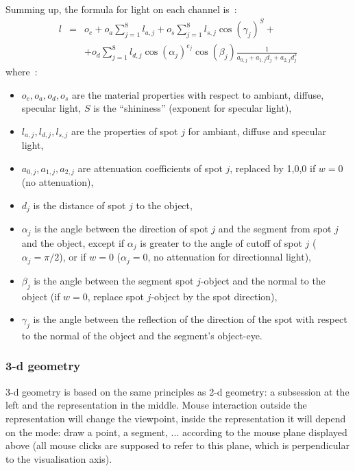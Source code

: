 \documentclass{article}
\begin{document}
Summing up, the formula for light on each channel is~:
\begin{eqnarray*}
 l &=&o_e+ o_a \sum_{j=1}^8 l_{a,j} + o_s \sum_{j=1}^8 l_{s,j}
 \cos(\gamma_j)^S + \\
 &  & +  o_d \sum_{j=1}^8 l_{d,j} 
\cos(\alpha_j)^{e_j} \cos(\beta_j) \frac{1}{a_{0,j}+a_{1,j}
  d_j+a_{2,j} d_j^2} 
\end{eqnarray*}
where~:
\begin{itemize}
\item $o_e,o_a,o_d,o_s$ are the material properties with respect to
 ambiant, diffuse, specular light, $S$ is the
``shininess'' (exponent for specular light),
\item $l_{a,j},l_{d,j},l_{s,j}$ are the properties of spot $j$ for
  ambiant, diffuse and specular light,
\item $a_{0,j}, a_{1,j}, a_{2,j}$ are attenuation coefficients
of spot $j$, replaced by 1,0,0 if $w=0$ (no attenuation),
\item $d_j$ is the distance of spot $j$ to the object,
\item $\alpha_j$ is the angle between the direction of spot $j$ and the
segment from spot $j$ and the object, except if $\alpha_j$ is
greater to the angle of cutoff of spot $j$ ($\alpha_j=\pi/2$), 
or if $w=0$ ($\alpha_j=0$, no attenuation for directionnal light),
\item $\beta_j$ is the angle between the segment spot $j$-object and
the normal to the object (if $w=0$, replace spot $j$-object by
the spot direction),
\item $\gamma_j$ is the angle between the reflection of the direction 
of the spot with respect to the normal of the object 
and the segment's object-eye.
\end{itemize}


\subsubsection{3-d geometry}
3-d geometry is based on the same principles as 2-d geometry: a
subsession at the left and the representation in the
middle. Mouse interaction outside the representation will
change the viewpoint, inside the representation it will depend
on the mode: draw a point, a segment, ... according to the mouse
plane displayed above (all mouse clicks are supposed to refer
to this plane, which is perpendicular to the visualisation axis).
\end{document}
